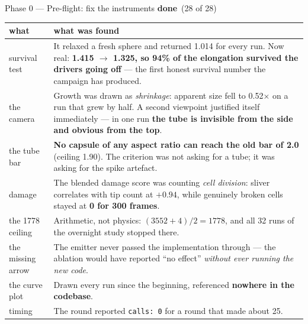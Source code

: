 \documentclass[11pt,a4paper]{article}
\newcommand{\code}[1]{\texttt{#1}}
\newcommand{\dn}{\textcolor{good}{\textbf{done}}}
\begin{document}
\begin{phasebox}{Phase 0 --- Pre-flight: fix the instruments \hfill \dn\ (28 of 28)}
\footnotesize
\begin{tabular}{@{}l p{11.4cm}@{}}
\toprule
\textbf{what} & \textbf{what was found}\\
\midrule
survival test & It relaxed a fresh sphere and returned 1.014 for every run. Now real:
  \textbf{1.415 $\to$ 1.325, so 94\% of the elongation survived the drivers going off} --- the first
  honest survival number the campaign has produced.\\
the camera & Growth was drawn as \emph{shrinkage}: apparent size fell to 0.52$\times$ on a run that
  grew by half. A second viewpoint justified itself immediately --- in one run \textbf{the tube is
  invisible from the side and obvious from the top}.\\
the tube bar & \textbf{No capsule of any aspect ratio can reach the old bar of 2.0} (ceiling 1.90).
  The criterion was not asking for a tube; it was asking for the spike artefact.\\
damage & The blended damage score was counting \emph{cell division}: sliver correlates with tip
  count at $+0.94$, while genuinely broken cells stayed at \textbf{0 for 300 frames}.\\
the 1778 ceiling & Arithmetic, not physics: $(3552{+}4)/2 = 1778$, and all 32 runs of the overnight
  study stopped there.\\
the missing arrow & The emitter never passed the implementation through --- the ablation would have
  reported ``no effect'' \emph{without ever running the new code}.\\
the curve plot & Drawn every run since the beginning, referenced \textbf{nowhere in the codebase}.\\
timing & The round reported \code{calls: 0} for a round that made about 25.\\
\bottomrule
\end{tabular}
\end{phasebox}
\end{document}
